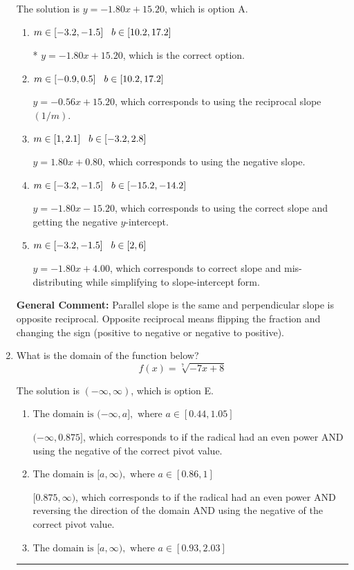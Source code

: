 \documentclass{extbook}[14pt]
\newcommand{\litem}[1]{\item #1

\rule{\textwidth}{0.4pt}}
\begin{document}
\begin{enumerate}
{The solution is \( y = -1.80x + 15.20 \), which is option A.\begin{enumerate}[label=\Alph*.]
\item \( m \in [-3.2, -1.5] \hspace*{3mm} b \in [10.2, 17.2] \)

* $y = -1.80x + 15.20$, which is the correct option.
\item \( m \in [-0.9, 0.5] \hspace*{3mm} b \in [10.2, 17.2] \)

 $y = -0.56x + 15.20$, which corresponds to using the reciprocal slope $(1/m)$.
\item \( m \in [1, 2.1] \hspace*{3mm} b \in [-3.2, 2.8] \)

 $y = 1.80x + 0.80$, which corresponds to using the negative slope.
\item \( m \in [-3.2, -1.5] \hspace*{3mm} b \in [-15.2, -14.2] \)

 $y = -1.80x - 15.20$, which corresponds to using the correct slope and getting the negative $y$-intercept.
\item \( m \in [-3.2, -1.5] \hspace*{3mm} b \in [2, 6] \)

 $y = -1.80x + 4.00$, which corresponds to correct slope and mis-distributing while simplifying to slope-intercept form.
\end{enumerate}

\textbf{General Comment:} Parallel slope is the same and perpendicular slope is opposite reciprocal. Opposite reciprocal means flipping the fraction and changing the sign (positive to negative or negative to positive).
}
\litem{
What is the domain of the function below?
\[ f(x) = \sqrt[7]{-7 x + 8} \]

The solution is \( (-\infty, \infty) \), which is option E.\begin{enumerate}[label=\Alph*.]
\item \( \text{The domain is } (-\infty, a], \text{   where } a \in [0.44, 1.05] \)

$(-\infty, 0.875]$, which corresponds to if the radical had an even power AND using the negative of the correct pivot value.
\item \( \text{The domain is } [a, \infty), \text{   where } a \in [0.86, 1] \)

$[0.875, \infty)$, which corresponds to if the radical had an even power AND reversing the direction of the domain AND using the negative of the correct pivot value.
\item \( \text{The domain is } [a, \infty), \text{   where } a \in [0.93, 2.03] \)


\end{enumerate}}
\end{enumerate}
\end{document}
